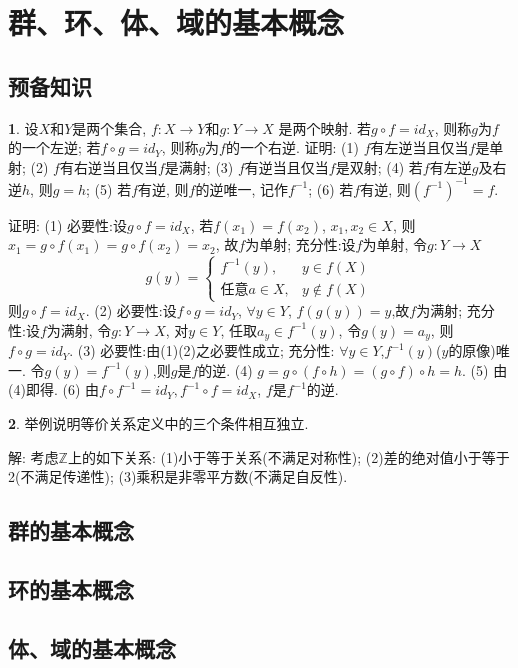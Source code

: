 \section{群、环、体、域的基本概念}

\subsection{预备知识}
\par \textbf{1}. 设$X$和$Y$是两个集合, $f:X \to Y$和$g:Y \to X$ 是两个映射. 若$g \circ f=id_X$, 则称$g$为$f$的一个左逆; 若$f \circ g=id_Y$, 则称$g$为$f$的一个右逆. 证明:
(1) $f$有左逆当且仅当$f$是单射;
(2) $f$有右逆当且仅当$f$是满射;
(3) $f$有逆当且仅当$f$是双射;
(4) 若$f$有左逆$g$及右逆$h$, 则$g=h$;
(5) 若$f$有逆, 则$f$的逆唯一, 记作$f^{-1}$;
(6) 若$f$有逆, 则$(f^{-1})^{-1}=f$.

\par 证明: (1) 必要性:设$g\circ f=id_X$, 若$f(x_1)=f(x_2)$,  $x_1,x_2\in X$, 则$x_1=g\circ f(x_1)=g\circ f(x_2)=x_2$, 故$f$为单射; 充分性:设$f$为单射, 令$g:Y\to X$
\begin{equation*}
g(y)=
\begin{cases}
f^{-1}(y),& y\in f(X)\\
\text{任意}a\in X, & y\notin f(X)
\end{cases}
\end{equation*}
则$g\circ f=id_X$.
(2) 必要性:设$f\circ g=id_Y$, $\forall y\in Y$, $f(g(y))=y$,故$f$为满射; 充分性:设$f$为满射, 令$g:Y\to X$, 对$y\in Y$, 任取$a_y\in f^{-1}(y)$, 令$g(y)=a_y$, 则$f\circ g=id_Y$.
(3) 必要性:由(1)(2)之必要性成立; 充分性: $\forall y\in Y$,$f^{-1}(y)$($y$的原像)唯一. 令$g(y)=f^{-1}(y)$,则$g$是$f$的逆.
(4) $g=g\circ(f\circ h)=(g\circ f)\circ h=h$.
(5) 由(4)即得.
(6) 由$f\circ f^{-1}=id_Y, f^{-1}\circ f=id_X$, $f$是$f^{-1}$的逆.

\par \textbf{2}. 举例说明等价关系定义中的三个条件相互独立.
\par 解: 考虑$\mathbb{Z}$上的如下关系:
(1)小于等于关系(不满足对称性);
(2)差的绝对值小于等于2(不满足传递性);
(3)乘积是非零平方数(不满足自反性).

\subsection{群的基本概念}
\subsection{环的基本概念}
\subsection{体、域的基本概念}